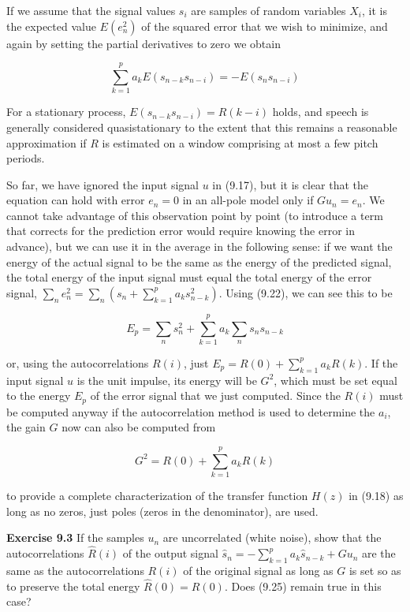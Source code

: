 \smallskip
\noindent
If we assume that the signal values $s_i$ are samples of random variables
$X_i$, it is the expected value $E(e_n^2)$ of the squared error that we wish to
minimize, and again by setting the partial derivatives to zero we obtain

\begin{equation}
\sum_{k=1}^p a_k E(s_{n-k}s_{n-i}) = - E(s_n s_{n-i})
\end{equation}

\noindent 
For a stationary process, $E(s_{n-k}s_{n-i})=R(k-i)$ holds, and speech is
generally considered quasistationary to the extent that this remains a
reasonable approximation if $R$ is estimated on a window comprising at most a
few pitch periods. 

So far, we have ignored the input signal $u$ in (9.17), but it is clear that
the equation can hold with error $e_n=0$ in an all-pole model only if
$Gu_n=e_n$. We cannot take advantage of this observation point by point (to
introduce a term that corrects for the prediction error would require knowing
the error in advance), but we can use it in the average in the following
sense: if we want the energy of the actual signal to be the same as the energy
of the predicted signal, the total energy of the input signal must equal the
total energy of the error signal, $\sum_n e_n^2 = \sum_n (s_n + \sum_{k=1}^p
a_ks_{n-k}^2)$. Using (9.22), we can see this to be

\begin{equation}
E_p = \sum_n s_n^2 + \sum_{k=1}^p a_k \sum_n s_ns_{n-k}
\end{equation}

\noindent
or, using the autocorrelations $R(i)$, just $E_p = R(0) + \sum_{k=1}^p a_k
R(k)$.  If the input signal $u$ is the unit impulse, its energy
will be $G^2$, which must be set equal to the energy $E_p$ of the error signal
that we just computed. Since the $R(i)$ must be computed anyway if the
autocorrelation method is used to determine the $a_i$, the gain $G$ now can
also be computed from 

\begin{equation}
G^2 = R(0) + \sum_{k=1}^p a_k R(k)
\end{equation}

\noindent
to provide a complete characterization of the transfer function $H(z)$ in
(9.18) as long as no zeros, just poles (zeros in the denominator), are used.

\smallskip
\noindent
{\bf Exercise 9.3} If the samples $u_n$ are uncorrelated (white noise), show
that the autocorrelations $\hat{R}(i)$ of the output signal
$\hat{s}_n=-\sum_{k=1}^p a_k \hat{s}_{n-k}+Gu_n$ are the same as the
autocorrelations $R(i)$ of the original signal as long as $G$ is set so as to
preserve the total energy $\hat{R}(0)=R(0)$. Does (9.25) remain true in
this case?

